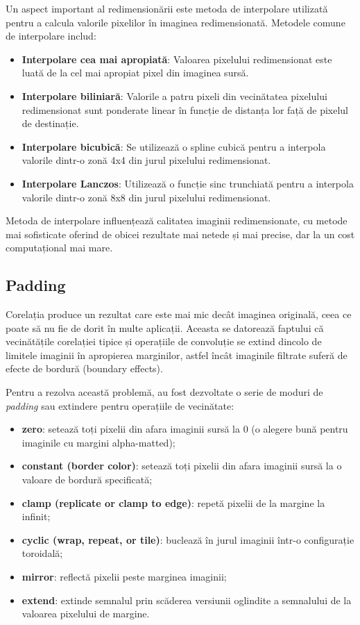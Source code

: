 Un aspect important al redimensionării este metoda de interpolare utilizată pentru a calcula valorile pixelilor în imaginea redimensionată. Metodele comune de interpolare includ:
\begin{itemize}
    \item \textbf{Interpolare cea mai apropiată}: Valoarea pixelului redimensionat este luată de la cel mai apropiat pixel din imaginea sursă.
    \item \textbf{Interpolare biliniară}: Valorile a patru pixeli din vecinătatea pixelului redimensionat sunt ponderate linear în funcție de distanța lor față de pixelul de destinație.
    \item \textbf{Interpolare bicubică}: Se utilizează o spline cubică pentru a interpola valorile dintr-o zonă 4x4 din jurul pixelului redimensionat.
    \item \textbf{Interpolare Lanczos}: Utilizează o funcție sinc trunchiată pentru a interpola valorile dintr-o zonă 8x8 din jurul pixelului redimensionat.
\end{itemize}

Metoda de interpolare influențează calitatea imaginii redimensionate, cu metode mai sofisticate oferind de obicei rezultate mai netede și mai precise, dar la un cost computațional mai mare.

\subsection*{Padding}

Corelația produce un rezultat care este mai mic decât imaginea originală, ceea ce poate să nu fie de dorit în multe aplicații. Aceasta se datorează faptului că vecinătățile corelației tipice și operațiile de convoluție se extind dincolo de limitele imaginii în apropierea marginilor, astfel încât imaginile filtrate suferă de efecte de bordură (boundary effects).

Pentru a rezolva această problemă, au fost dezvoltate o serie de moduri de \textit{padding} sau extindere pentru operațiile de vecinătate:

\begin{itemize}
    \item \textbf{zero}: setează toți pixelii din afara imaginii sursă la 0 (o alegere bună pentru imaginile cu margini alpha-matted);
    \item \textbf{constant (border color)}: setează toți pixelii din afara imaginii sursă la o valoare de bordură specificată;
    \item \textbf{clamp (replicate or clamp to edge)}: repetă pixelii de la margine la infinit;
    \item \textbf{cyclic (wrap, repeat, or tile)}: buclează în jurul imaginii într-o configurație toroidală;
    \item \textbf{mirror}: reflectă pixelii peste marginea imaginii;
    \item \textbf{extend}: extinde semnalul prin scăderea versiunii oglindite a semnalului de la valoarea pixelului de margine.
\end{itemize}

